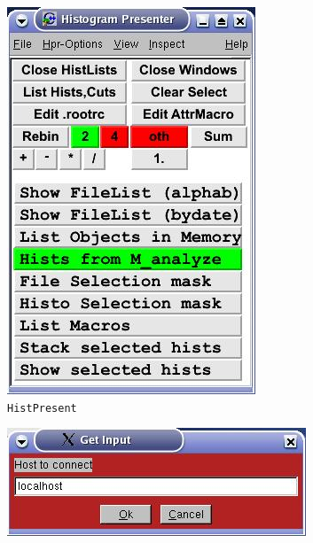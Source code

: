 \documentclass[10pt]{article}
\begin{document}
\begin{center}
\begin{minipage}[t]{.4\linewidth}
\begin{figure}[H]
\centerline{\includegraphics[width=\linewidth]{HistPresentGUI}}
\caption{\texttt{HistPresent}}
\label{HistPresentConnect}
\end{figure}
\end{minipage}\qquad\qquad
\begin{minipage}[t]{.4\linewidth}
\begin{figure}[H]
\centerline{\includegraphics[width=\linewidth]{HistPresentConnectToHost}}

\end{figure}
\end{minipage}
\end{center}
\end{document}
